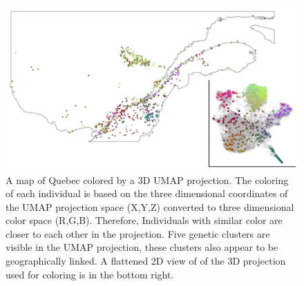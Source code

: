 \documentclass[
11pt, %
oneside, %
english, %
doublespacing, %
headsepline, %
chapterinoneline, %
]{MastersDoctoralThesis} %
\begin{document}
\begin{figure}
\includegraphics[width=\hsize,keepaspectratio]{./Figures/Genizon_BalSac_mapsInMaps4.jpg}

\caption{A map of Quebec colored by a 3D UMAP projection. 
The coloring of each individual is based on the three dimensional coordinates of the UMAP projection space (X,Y,Z) converted to three dimensional color space (R,G,B).
Therefore, Individuals with similar color are closer to each other in the projection.
Five genetic clusters are visible in the UMAP projection, these clusters also appear to be geographically linked. 
A flattened 2D view of of the 3D projection used for coloring is in the bottom right.}
\label{UMAP}
\end{figure}

\clearpage


%



\printbibliography[heading=bibintoc]

\end{document}
